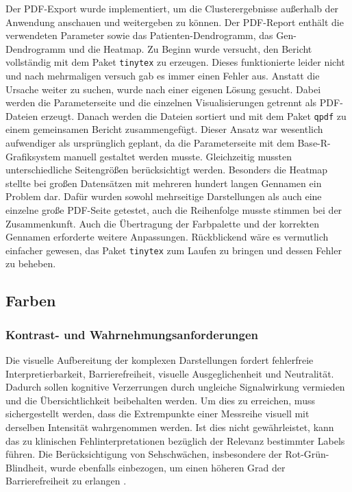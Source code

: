 \documentclass[12pt]{article}
\begin{document}
Der PDF-Export wurde implementiert, um die Clusterergebnisse außerhalb der Anwendung anschauen und weitergeben zu können. Der PDF-Report enthält die verwendeten Parameter sowie das Patienten-Dendrogramm, das Gen-Dendrogramm und die Heatmap. Zu Beginn wurde versucht, den Bericht vollständig mit dem Paket \texttt{tinytex} zu erzeugen. Dieses funktionierte leider nicht und nach mehrmaligen versuch gab es immer einen Fehler aus. Anstatt die Ursache weiter zu suchen, wurde nach einer eigenen Lösung gesucht. Dabei werden die Parameterseite und die einzelnen Visualisierungen getrennt als PDF-Dateien erzeugt. Danach werden die Dateien sortiert und mit dem Paket \texttt{qpdf} zu einem gemeinsamen Bericht zusammengefügt. Dieser Ansatz war wesentlich aufwendiger als ursprünglich geplant, da die Parameterseite mit dem Base-R-Grafiksystem manuell gestaltet werden musste. Gleichzeitig mussten unterschiedliche Seitengrößen berücksichtigt werden. Besonders die Heatmap stellte bei großen Datensätzen mit mehreren hundert langen Gennamen ein Problem dar. Dafür wurden sowohl mehrseitige Darstellungen als auch eine einzelne große PDF-Seite getestet, auch die Reihenfolge musste stimmen bei der  Zusammenkunft. Auch die Übertragung der Farbpalette und der korrekten Gennamen erforderte weitere Anpassungen. Rückblickend wäre es vermutlich einfacher gewesen, das Paket \texttt{tinytex} zum Laufen zu bringen und dessen Fehler zu beheben.

\newpage
\pagestyle{fancy}
\fancyhead{}
\subsection{Farben}
\subsubsection{Kontrast- und Wahrnehmungsanforderungen}

Die visuelle Aufbereitung der komplexen Darstellungen fordert fehlerfreie Interpretierbarkeit, Barrierefreiheit, visuelle Ausgeglichenheit und Neutralität. Dadurch sollen kognitive Verzerrungen durch ungleiche Signalwirkung vermieden und die Übersichtlichkeit beibehalten werden. Um dies zu erreichen, muss sichergestellt werden, dass die Extrempunkte einer Messreihe visuell mit derselben Intensität wahrgenommen werden. Ist dies nicht gewährleistet, kann das zu klinischen Fehlinterpretationen bezüglich der Relevanz bestimmter Labels führen. Die Berücksichtigung von Sehschwächen, insbesondere der Rot-Grün-Blindheit, wurde ebenfalls einbezogen, um einen höheren Grad der Barrierefreiheit zu erlangen \cite{Crameri2020}.
\end{document}
